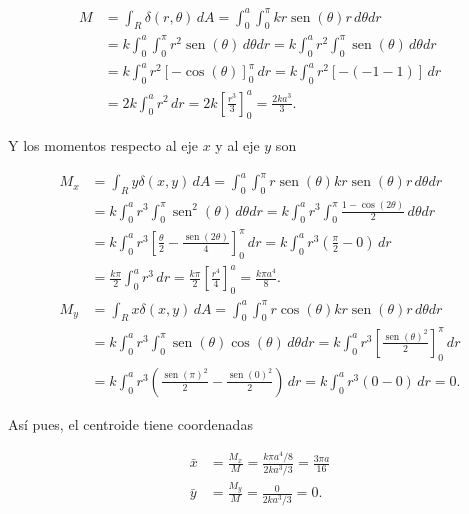 \documentclass[
  spanish,
  a4paper,
]{scrreport}
\theoremstyle{definition}
\theoremstyle{remark}
\begin{document}
\begin{tcolorbox}
\begin{enumerate}
  \begin{align*}
  M &= \int_R \delta(r,\theta)\, dA 
  = \int_0^a \int_0^\pi kr\operatorname{sen}(\theta) r\, d\theta dr \\
  &= k \int_0^a \int_0^\pi r^2\operatorname{sen}(\theta)\, d\theta dr 
  = k \int_0^a r^2\int_0^\pi \operatorname{sen}(\theta)\, d\theta dr \\ 
  &= k \int_0^a r^2 [-\cos(\theta)]_0^\pi\, dr 
  = k \int_0^a r^2 [-(-1-1)]\, dr \\
  &= 2k \int_0^a r^2\, dr
  = 2k \left[ \frac{r^3}{3} \right]_0^a
  = \frac{2ka^3}{3}.
  \end{align*}

  Y los momentos respecto al eje \(x\) y al eje \(y\) son

  \begin{align*}
  M_x &=
  \int_R y\delta(x,y)\, dA
  = \int_0^a \int_0^\pi r\operatorname{sen}(\theta) kr\operatorname{sen}(\theta)r\, d\theta dr \\
  &= k \int_0^a r^3\int_0^\pi \operatorname{sen}^2(\theta)\, d\theta dr
  = k \int_0^a r^3\int_0^\pi \frac{1-\cos(2\theta)}{2}\, d\theta dr \\
  &= k \int_0^a r^3\left[ \frac{\theta}{2}-\frac{\operatorname{sen}(2\theta)}{4} \right]_0^\pi\, dr 
  = k \int_0^a r^3 \left(\frac{\pi}{2}-0\right)\, dr \\
  &= \frac{k\pi}{2} \int_0^a r^3\, dr
  = \frac{k\pi}{2} \left[ \frac{r^4}{4} \right]_0^a
  = \frac{k\pi a^4}{8}. \\
  M_y &=
  \int_R x\delta(x,y)\, dA
  = \int_0^a \int_0^\pi r\cos(\theta) kr\operatorname{sen}(\theta)r\, d\theta dr \\
  &= k \int_0^a r^3\int_0^\pi \operatorname{sen}(\theta)\cos(\theta)\, d\theta dr
  = k \int_0^a r^3\left[ \frac{\operatorname{sen}(\theta)^2}{2} \right]_0^\pi\, dr \\
  &= k \int_0^a r^3\left(\frac{\operatorname{sen}(\pi)^2}{2} - \frac{\operatorname{sen}(0)^2}{2}\right) \, dr 
  = k \int_0^a r^3 (0 - 0) \, dr
  = 0.
  \end{align*}

  Así pues, el centroide tiene coordenadas

  \begin{align*}
  \bar{x} &= \frac{M_x}{M} = \frac{k\pi a^4/8}{2ka^3/3} = \frac{3\pi a}{16} \\
  \bar{y} &= \frac{M_y}{M} = \frac{0}{2ka^3/3} = 0.
  \end{align*}
\end{enumerate}

\end{tcolorbox}
\end{document}
